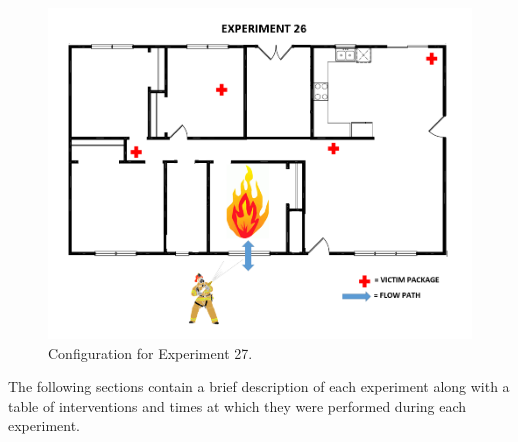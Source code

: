 \documentclass[12pt,oneside]{book}
\begin{document}
\begin{figure}[H]
	\centering
	\includegraphics[width=5in]{Figures/General/Exp27.png}
	\caption{Configuration for Experiment 27.}
	\label{fig:Single_Vent_ext_alt2}
\end{figure}

\begin{table}[H]
\caption{Experiment 26}
\centering
{}
\label{table:Exp26}
\end{table}

The following sections contain a brief description of each experiment along with a table of interventions and times at which they were performed during each experiment. 

\FloatBarrier
\end{document}
